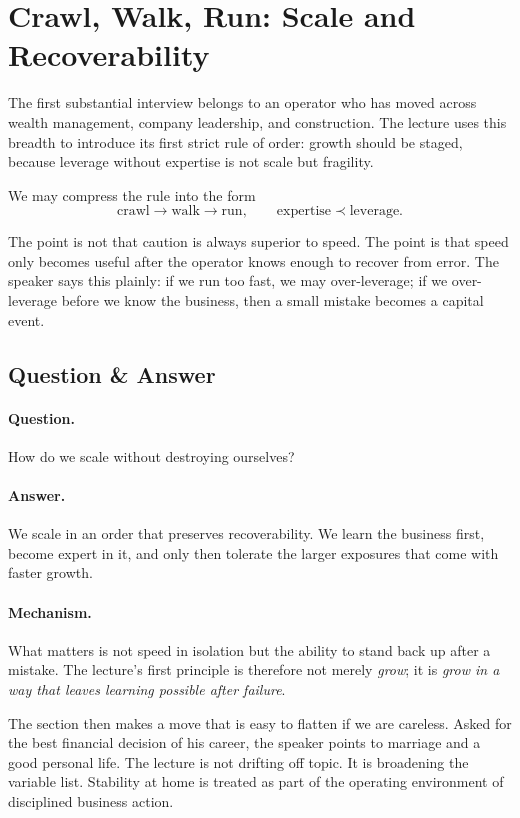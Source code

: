 \section{Crawl, Walk, Run: Scale and Recoverability}

The first substantial interview belongs to an operator who has moved across wealth management, company leadership, and construction. The lecture uses this breadth to introduce its first strict rule of order: growth should be staged, because leverage without expertise is not scale but fragility.

We may compress the rule into the form
\begin{equation}
\text{crawl} \to \text{walk} \to \text{run},
\qquad
\text{expertise} \prec \text{leverage}.
\end{equation}

The point is not that caution is always superior to speed. The point is that speed only becomes useful after the operator knows enough to recover from error. The speaker says this plainly: if we run too fast, we may over-leverage; if we over-leverage before we know the business, then a small mistake becomes a capital event.

\subsection{Question \& Answer}

\paragraph{Question.} How do we scale without destroying ourselves?

\paragraph{Answer.} We scale in an order that preserves recoverability. We learn the business first, become expert in it, and only then tolerate the larger exposures that come with faster growth.

\paragraph{Mechanism.} What matters is not speed in isolation but the ability to stand back up after a mistake. The lecture's first principle is therefore not merely \emph{grow}; it is \emph{grow in a way that leaves learning possible after failure}.

The section then makes a move that is easy to flatten if we are careless. Asked for the best financial decision of his career, the speaker points to marriage and a good personal life. The lecture is not drifting off topic. It is broadening the variable list. Stability at home is treated as part of the operating environment of disciplined business action.

